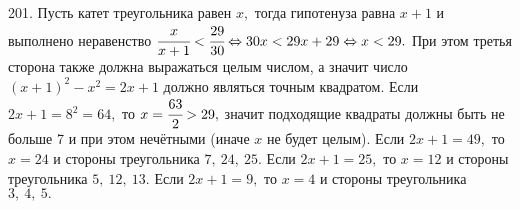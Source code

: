 201. Пусть катет треугольника равен $x,$ тогда гипотенуза равна $x+1$ и выполнено неравенство $\cfrac{x}{x+1}<\cfrac{29}{30}\Leftrightarrow 30x<29x+29
\Leftrightarrow x<29.$ При этом третья сторона также должна выражаться целым числом, а значит число $(x+1)^2-x^2=2x+1$ должно являться точным квадратом.
Если $2x+1=8^2=64,$ то $x=\cfrac{63}{2}>29,$ значит подходящие квадраты должны быть не больше 7 и при этом нечётными (иначе $x$ не будет целым). Если $2x+1=49,$ то $x=24$ и стороны треугольника $7,\ 24,\ 25.$ Если $2x+1=25,$ то $x=12$ и стороны треугольника $5,\ 12,\ 13.$ Если $2x+1=9,$ то $x=4$ и стороны треугольника $3,\ 4,\ 5.$\\
